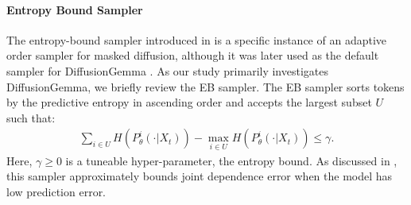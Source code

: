 \paragraph{Entropy Bound Sampler}
The entropy-bound sampler introduced in \citet{ben2026accelerated} is a specific instance of an adaptive order sampler for masked diffusion, although it was later used as the default sampler for DiffusionGemma \citep{team2026diffusiongemma}.
As our study primarily investigates DiffusionGemma, we briefly review the EB sampler.
The EB sampler sorts tokens by the predictive entropy in ascending order and accepts the largest subset $U$ such that: 
\begin{align}
    \label{eq:eb-bound}
    \sum_{i \in U} H(P_{\theta}^i(\cdot | X_t)) - \max_{i \in U}  H(P_{\theta}^i(\cdot | X_t)) \le \gamma.
\end{align}
Here, $\gamma \ge 0$ is a tuneable hyper-parameter, the entropy bound. As discussed in \citet{ben2026accelerated}, this sampler approximately bounds joint dependence error when the model has low prediction error. 





 

 
 

 
